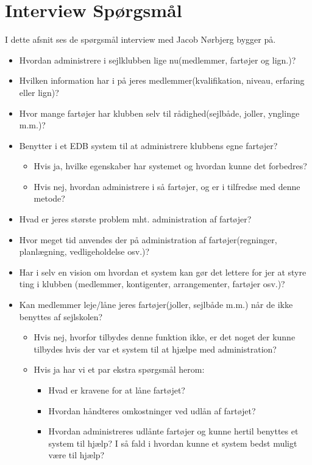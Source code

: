 \chapter{Interview Spørgsmål} \label{questions}
I dette afsnit ses de spørgsmål interview med Jacob Nørbjerg bygger på.

\begin{itemize}
\item Hvordan administrere i sejlklubben lige nu(medlemmer, fartøjer og lign.)?
\item Hvilken information har i på jeres medlemmer(kvalifikation, niveau, erfaring eller lign)?
\item Hvor mange fartøjer har klubben selv til rådighed(sejlbåde, joller, ynglinge m.m.)?
\item Benytter i et EDB system til at administrere klubbens egne fartøjer?
	\begin{itemize}
	\item Hvis ja, hvilke egenskaber har systemet og hvordan kunne det forbedres?
	\item Hvis nej, hvordan administrere i så fartøjer, og er i tilfredse med denne metode?
	\end{itemize}
\item Hvad er jeres største problem mht. administration af fartøjer?
\item Hvor meget tid anvendes der på administration af fartøjer(regninger, planlægning, vedligeholdelse osv.)?
\item Har i selv en vision om hvordan et system kan gør det lettere for jer at styre ting i klubben (medlemmer, kontigenter, arrangementer, fartøjer osv.)?
\item Kan medlemmer leje/låne jeres fartøjer(joller, sejlbåde m.m.) når de ikke benyttes af sejlskolen?
	\begin{itemize}
	\item Hvis nej, hvorfor tilbydes denne funktion ikke, er det noget der kunne tilbydes hvis der var et system til at hjælpe med administration?
	\item Hvis ja har vi et par ekstra spørgsmål herom:
		\begin{itemize}
		\item Hvad er kravene for at låne fartøjet?
		\item Hvordan håndteres omkostninger ved udlån af fartøjet?
		\item Hvordan administreres udlånte fartøjer og kunne hertil benyttes et system til hjælp? I så fald i hvordan kunne et system bedst muligt være til hjælp?
		\end{itemize}
	\end{itemize}
\end{itemize}
